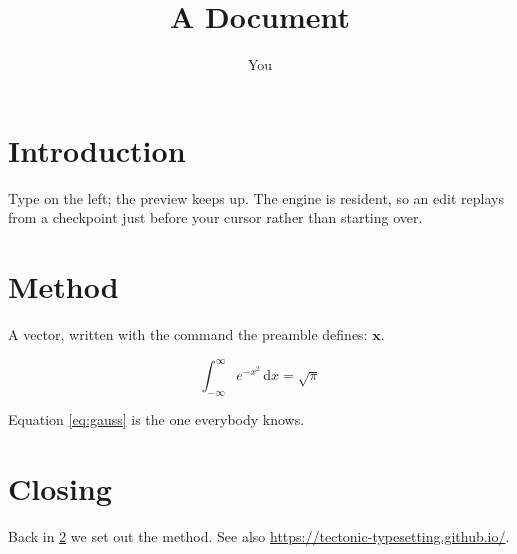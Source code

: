 \documentclass[11pt]{article}
\title{A Document}
\author{You}
\newcommand{\vect}[1]{\mathbf{#1}}
\begin{document}
\maketitle

\section{Introduction}\label{sec:intro}

Type on the left; the preview keeps up. The engine is resident, so an
edit replays from a checkpoint just before your cursor rather than
starting over.

\section{Method}\label{sec:method}

A vector, written with the command the preamble defines: $\vect{x}$.

\begin{equation}\label{eq:gauss}
  \int_{-\infty}^{\infty} e^{-x^2}\,\mathrm{d}x = \sqrt{\pi}
\end{equation}

Equation \eqref{eq:gauss} is the one everybody knows.


\section{Closing}

Back in \ref{sec:method} we set out the method. See also
\url{https://tectonic-typesetting.github.io/}.



\end{document}
